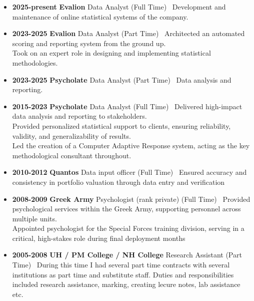 \documentclass[
]{article}
\begin{document}
\begin{tcolorbox}[colframe=gray!70!black,colback=gray!10!white,left=-1pt,sharp corners,title=Experience]
\begin{itemize}[leftmargin=*,label={--},itemsep=0em]\item
\textbf{2025-present}
\textbf{ Evalion }
Data Analyst 
(Full Time)
\newline\ Development and maintenance of online statistical systems of the company.  
\item
\textbf{2023-2025}
\textbf{ Evalion }
Data Analyst 
(Part Time)
\newline\ Architected an automated scoring and reporting system from the ground up.\\Took on an expert role in designing and implementing statistical methodologies.  
\item
\textbf{2023-2025}
\textbf{ Psycholate }
Data Analyst 
(Part Time)
\newline\ Data analysis and reporting.  
\item
\textbf{2015-2023}
\textbf{ Psycholate }
Data Analyst 
(Full Time)
\newline\ Delivered high-impact data analysis and reporting to stakeholders.\\Provided personalized statistical support to clients, ensuring reliability, validity, and generalizability of results.\\Led the creation of a Computer Adaptive Response system, acting as the key methodological consultant throughout.  
\item
\textbf{2010-2012}
\textbf{ Quantos }
Data input officer 
(Full Time)
\newline\ Ensured accuracy and consistency in portfolio valuation through data entry and verification  
\item
\textbf{2008-2009}
\textbf{ Greek Army }
Psychologist (rank private) 
(Full Time)
\newline\ Provided psychological services within the Greek Army, supporting personnel across multiple units.\\Appointed psychologist for the Special Forces training division, serving in a critical, high-stakes role during final deployment months  
\item
\textbf{2005-2008}
\textbf{ UH / PM College / NH College }
Research Assistant 
(Part Time)
\newline\ During this time I had several part time contracts with several institutions as part time and substitute staff. Duties and responsibilities included research assistance, marking, creating lecure notes, lab assistance etc.  
\end{itemize}
\end{tcolorbox}
\end{document}
